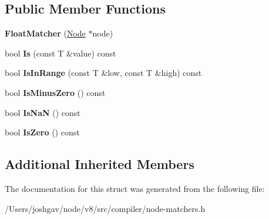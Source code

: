 \subsection*{Public Member Functions}
\begin{DoxyCompactItemize}
\item 
{\bfseries Float\+Matcher} (\hyperlink{classv8_1_1internal_1_1compiler_1_1_node}{Node} $\ast$node)\hypertarget{structv8_1_1internal_1_1compiler_1_1_float_matcher_ad64139cfef1002e328dd8ebe8ce1614a}{}\label{structv8_1_1internal_1_1compiler_1_1_float_matcher_ad64139cfef1002e328dd8ebe8ce1614a}

\item 
bool {\bfseries Is} (const T \&value) const \hypertarget{structv8_1_1internal_1_1compiler_1_1_float_matcher_aab3f0c17758ace69c0e05449760e20a0}{}\label{structv8_1_1internal_1_1compiler_1_1_float_matcher_aab3f0c17758ace69c0e05449760e20a0}

\item 
bool {\bfseries Is\+In\+Range} (const T \&low, const T \&high) const \hypertarget{structv8_1_1internal_1_1compiler_1_1_float_matcher_a039dc1a82be7e3a086de1300a26c2c4a}{}\label{structv8_1_1internal_1_1compiler_1_1_float_matcher_a039dc1a82be7e3a086de1300a26c2c4a}

\item 
bool {\bfseries Is\+Minus\+Zero} () const \hypertarget{structv8_1_1internal_1_1compiler_1_1_float_matcher_a2468a316a51639704a0bd309da038208}{}\label{structv8_1_1internal_1_1compiler_1_1_float_matcher_a2468a316a51639704a0bd309da038208}

\item 
bool {\bfseries Is\+NaN} () const \hypertarget{structv8_1_1internal_1_1compiler_1_1_float_matcher_ad6e9871625da45ed9011adff33f4e374}{}\label{structv8_1_1internal_1_1compiler_1_1_float_matcher_ad6e9871625da45ed9011adff33f4e374}

\item 
bool {\bfseries Is\+Zero} () const \hypertarget{structv8_1_1internal_1_1compiler_1_1_float_matcher_a4c9c19206b9cf72b5f9422132dbca1f7}{}\label{structv8_1_1internal_1_1compiler_1_1_float_matcher_a4c9c19206b9cf72b5f9422132dbca1f7}

\end{DoxyCompactItemize}
\subsection*{Additional Inherited Members}


The documentation for this struct was generated from the following file\+:\begin{DoxyCompactItemize}
\item 
/\+Users/joshgav/node/v8/src/compiler/node-\/matchers.\+h\end{DoxyCompactItemize}
